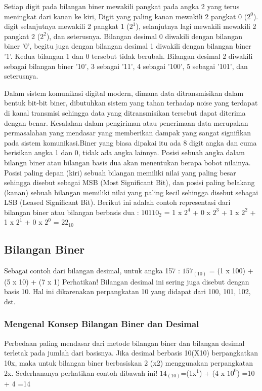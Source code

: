 \documentclass{article}
\begin{document}
Setiap digit pada bilangan biner mewakili pangkat pada angka 2 yang terus meningkat dari kanan ke kiri, Digit yang paling kanan mewakili 2 pangkat 0 ($2^0$). digit selanjutnya mewakili 2 pangkat 1 ($2^1$), selanjutnya lagi mewakili mewakili 2 pangkat 2 ($2^2$), dan seterusnya. Bilangan desimal 0 diwakili dengan bilangan biner '0', begitu juga dengan bilangan desimal 1 diwakili dengan bilangan biner '1'. Kedua bilangan 1 dan 0 tersebut tidak berubah. Bilangan desimal 2 diwakili sebagai bilangan biner '10', 3 sebagai '11', 4 sebagai '100', 5 sebagai '101', dan seterusnya.

Dalam sistem komunikasi digital modern, dimana data ditransmisikan dalam bentuk bit-bit biner, dibutuhkan sistem yang tahan terhadap noise yang terdapat di kanal transmisi sehingga data yang ditransmisikan tersebut dapat diterima dengan benar. Kesalahan dalam pengiriman atau penerimaan data merupakan permasalahan yang mendasar yang memberikan dampak yang sangat signifikan pada sistem komunikasi.Biner yang biasa dipakai itu ada 8 digit angka dan cuma berisikan angka 1 dan 0, tidak ada angka lainnya.
Posisi sebuah angka dalam bilangn biner atau bilangan basis dua akan menentukan berapa bobot nilainya. Posisi paling depan (kiri) sebuah bilangan memiliki nilai yang paling besar sehingga disebut sebagai MSB (Most Significant Bit), dan posisi paling belakang (kanan) sebuah bilangan memiliki nilai yang paling kecil sehingga disebut sebagai LSB (Leased Significant Bit). Berikut ini adalah contoh representasi dari bilangan biner atau bilangan berbasis dua : 
$10110_2$ = 1 x $2^4$ + 0 x $2^3$ + 1 x $2^2$ + 1 x $2^1$ + 0 x $2^0$ = $22_{10}$

\subsection{Bilangan Biner}
Sebagai contoh dari bilangan desimal, untuk angka 157 : $157_{(10)}$ = (1 x 100) + (5 x 10) + (7 x 1) 
Perhatikan! Bilangan desimal ini sering juga disebut dengan basis 10. Hal ini dikarenakan perpangkatan 10 yang didapat dari 100, 101, 102, dst. 
\subsubsection{Mengenal Konsep Bilangan Biner dan Desimal}
Perbedaan paling mendasar dari metode bilangan biner dan bilangan desimal terletak pada jumlah dari basisnya. Jika desimal berbasis 10(X10) berpangkatkan 10x, maka untuk bilangan biner berbasiskan 2 (x2) menggunakan perpangkatan 2x. Sederhananya perhatikan contoh dibawah ini!
$14_{(10)}$=(1x$^1$) + (4 x $10^0$)
=10 + 4
=14
\end{document}
